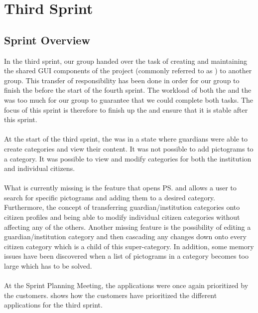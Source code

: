 \part{Third Sprint}
\label{par:third_sprint}

\chapter{Sprint Overview}
In the third sprint, our group handed over the task of creating and maintaining the shared GUI components of the project (commonly referred to as \gc) to another group. This transfer of responsibility has been done in order for our group to finish the \ct before the start of the fourth sprint. The workload of both the \ct and the \gc was too much for our group to guarantee that we could complete both tasks. The focus of this sprint is therefore to finish up the \ct and ensure that it is stable after this sprint.
\\\\
At the start of the third sprint, the \ct was in a state where guardians were able to create categories and view their content. It was not possible to add pictograms to a category. It was possible to view and modify categories for both the institution and individual citizens.
\\\\
What is currently missing is the feature that opens \ps and allows a user to search for specific pictograms and adding them to a desired category. Furthermore, the concept of transferring guardian/institution categories onto citizen profiles and being able to modify individual citizen categories without affecting any of the others. Another missing feature is the possibility of editing a guardian/institution category and then cascading any changes down onto every citizen category which is a child of this super-category. In addition, some memory issues have been discovered when a list of pictograms in a category becomes too large which has to be solved. 
\\\\
At the Sprint Planning Meeting, the applications were once again prioritized by the customers.  shows how the customers have prioritized the different applications for the third sprint.

